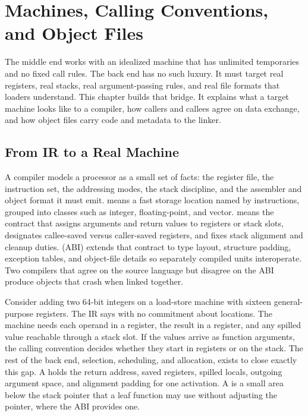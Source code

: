 \chapter{Machines, Calling Conventions, and Object Files}\label{ch:machines-conventions-object-files}

The middle end works with an idealized machine that has unlimited temporaries and no fixed call rules.
The back end has no such luxury.
It must target real registers, real stacks, real argument-passing rules, and real file formats that loaders understand.
This chapter builds that bridge.
It explains what a target machine looks like to a compiler, how callers and callees agree on data exchange, and how object files carry code and metadata to the linker.

\section{From IR to a Real Machine}\label{sec:ch24-machine-model}

A compiler models a processor as a small set of facts: the register file, the instruction set, the addressing modes, the stack discipline, and the assembler and object format it must emit.
 means a fast storage location named by instructions, grouped into classes such as integer, floating-point, and vector.
 means the contract that assigns arguments and return values to registers or stack slots, designates callee-saved versus caller-saved registers, and fixes stack alignment and cleanup duties.
 (ABI) extends that contract to type layout, structure padding, exception tables, and object-file details so separately compiled units interoperate.
Two compilers that agree on the source language but disagree on the ABI produce objects that crash when linked together.

Consider adding two 64-bit integers on a load-store machine with sixteen general-purpose registers.
The IR says  with no commitment about locations.
The machine needs each operand in a register, the result in a register, and any spilled value reachable through a stack slot.
If the values arrive as function arguments, the calling convention decides whether they start in registers or on the stack.
The rest of the back end, selection, scheduling, and allocation, exists to close exactly this gap.
A  holds the return address, saved registers, spilled locals, outgoing argument space, and alignment padding for one activation.
A  is a small area below the stack pointer that a leaf function may use without adjusting the pointer, where the ABI provides one.

